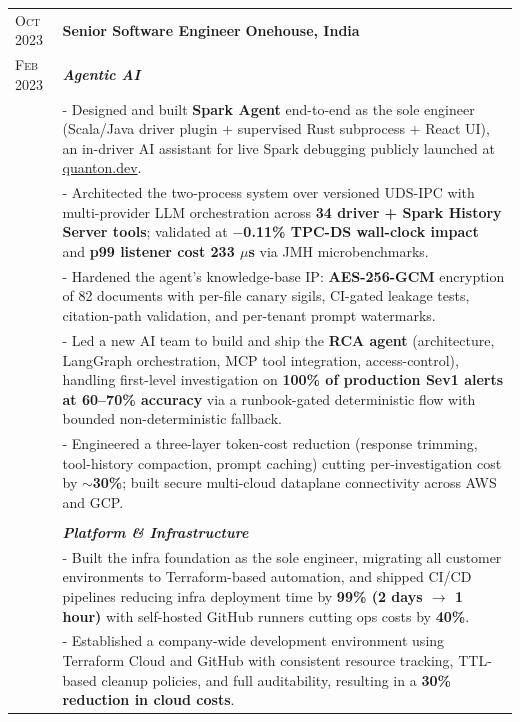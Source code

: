 \documentclass[a4paper,10pt]{extarticle}
\begin{document}
\begin{tabularx}{\linewidth}{ l | X }
\textsc{Oct 2023} & \textbf{{Senior Software Engineer}} \hfill\textbf{Onehouse, India}\\
\textsc{Feb 2023} & \textcolor{subheadcolour}{\textit{\textbf{Agentic AI}}}\\[2pt]
& \small{- Designed and built \textbf{Spark Agent} end-to-end as the sole engineer (Scala/Java driver plugin + supervised Rust subprocess + React UI), an in-driver AI assistant for live Spark debugging publicly launched at \href{https://quanton.dev/\#ai}{quanton.dev}.}\\
& \small{- Architected the two-process system over versioned UDS-IPC with multi-provider LLM orchestration across \textbf{34 driver + Spark History Server tools}; validated at \textbf{$-$0.11\% TPC-DS wall-clock impact} and \textbf{p99 listener cost 233 $\mu$s} via JMH microbenchmarks.}\\
& \small{- Hardened the agent's knowledge-base IP: \textbf{AES-256-GCM} encryption of 82 documents with per-file canary sigils, CI-gated leakage tests, citation-path validation, and per-tenant prompt watermarks.}\\
& \small{- Led a new AI team to build and ship the \textbf{RCA agent} (architecture, LangGraph orchestration, MCP tool integration, access-control), handling first-level investigation on \textbf{100\% of production Sev1 alerts at 60--70\% accuracy} via a runbook-gated deterministic flow with bounded non-deterministic fallback.}\\
& \small{- Engineered a three-layer token-cost reduction (response trimming, tool-history compaction, prompt caching) cutting per-investigation cost by \textbf{$\sim$30\%}; built secure multi-cloud dataplane connectivity across AWS and GCP.}\\
& \\[-2pt]
& \textcolor{subheadcolour}{\textit{\textbf{Platform \& Infrastructure}}}\\[2pt]
& \small{- Built the infra foundation as the sole engineer, migrating all customer environments to Terraform-based automation, and shipped CI/CD pipelines reducing infra deployment time by \textbf{99\% (2 days $\rightarrow$ 1 hour)} with self-hosted GitHub runners cutting ops costs by \textbf{40\%}.}\\
& \small{- Established a company-wide development environment using Terraform Cloud and GitHub with consistent resource tracking, TTL-based cleanup policies, and full auditability, resulting in a \textbf{30\% reduction in cloud costs}.}\\

\end{tabularx}
\end{document}
